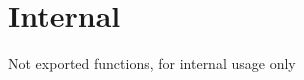 \hypertarget{group__lavu__internal}{}\section{Internal}
\label{group__lavu__internal}
Not exported functions, for internal usage only 